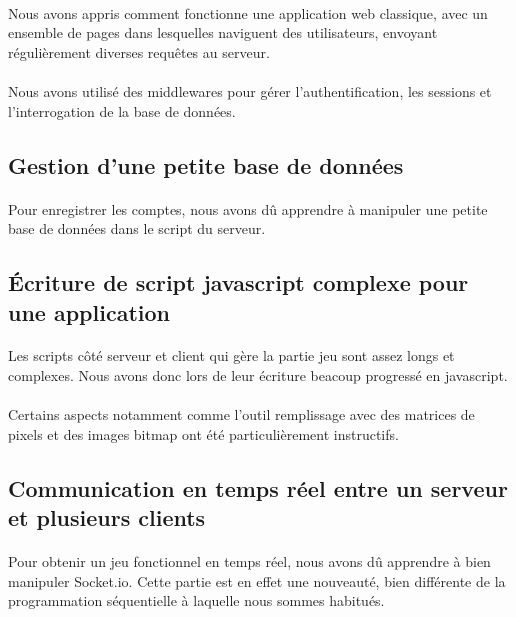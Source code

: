 \documentclass[11pt,a4paper]{article}
\begin{document}
            \paragraph{}
            Nous avons appris comment fonctionne une application web classique,
            avec un ensemble de pages dans lesquelles naviguent des utilisateurs,
            envoyant régulièrement diverses requêtes au serveur.
            \paragraph{}
            Nous avons utilisé des middlewares pour gérer l'authentification,
            les sessions et l'interrogation de la base de données.
        
        \subsection*{Gestion d'une petite base de données}
            \paragraph{}
            Pour enregistrer les comptes,
            nous avons dû apprendre à manipuler une petite base de données dans le script du serveur.
        \subsection*{Écriture de script javascript complexe pour une application}
            \paragraph{}
            Les scripts côté serveur et client qui gère la partie jeu sont assez longs et complexes.
            Nous avons donc lors de leur écriture beacoup progressé en javascript.
            \paragraph{}
            Certains aspects notamment comme l'outil remplissage avec des matrices de pixels et des images bitmap 
            ont été particulièrement instructifs.
        \subsection*{Communication en temps réel entre un serveur et plusieurs clients}
            \paragraph{}
            Pour obtenir un jeu fonctionnel en temps réel, nous avons dû apprendre à bien manipuler Socket.io.
            Cette partie est en effet une nouveauté,
            bien différente de la programmation séquentielle à laquelle nous sommes habitués.
\end{document}
